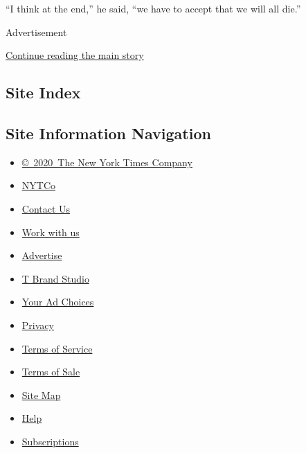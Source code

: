 ``I think at the end,'' he said, ``we have to accept that we will all
die.''

Advertisement

\protect\hyperlink{after-bottom}{Continue reading the main story}

\hypertarget{site-index}{%
\subsection{Site Index}\label{site-index}}

\hypertarget{site-information-navigation}{%
\subsection{Site Information
Navigation}\label{site-information-navigation}}

\begin{itemize}
\tightlist
\item
  \href{https://help.nytimes.com/hc/en-us/articles/115014792127-Copyright-notice}{©~2020~The
  New York Times Company}
\end{itemize}

\begin{itemize}
\tightlist
\item
  \href{https://www.nytco.com/}{NYTCo}
\item
  \href{https://help.nytimes.com/hc/en-us/articles/115015385887-Contact-Us}{Contact
  Us}
\item
  \href{https://www.nytco.com/careers/}{Work with us}
\item
  \href{https://nytmediakit.com/}{Advertise}
\item
  \href{http://www.tbrandstudio.com/}{T Brand Studio}
\item
  \href{https://www.nytimes.com/privacy/cookie-policy\#how-do-i-manage-trackers}{Your
  Ad Choices}
\item
  \href{https://www.nytimes.com/privacy}{Privacy}
\item
  \href{https://help.nytimes.com/hc/en-us/articles/115014893428-Terms-of-service}{Terms
  of Service}
\item
  \href{https://help.nytimes.com/hc/en-us/articles/115014893968-Terms-of-sale}{Terms
  of Sale}
\item
  \href{https://spiderbites.nytimes.com}{Site Map}
\item
  \href{https://help.nytimes.com/hc/en-us}{Help}
\item
  \href{https://www.nytimes.com/subscription?campaignId=37WXW}{Subscriptions}
\end{itemize}
